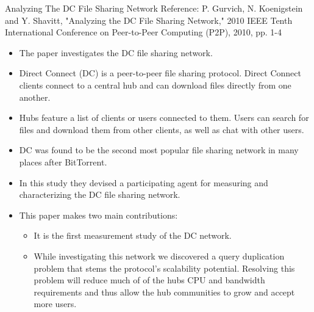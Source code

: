 \documentclass[9pt]{beamer}
\begin{document}
\begin{frame}{Analyzing The DC File Sharing Network}
    \small Reference: P. Gurvich, N. Koenigstein and Y. Shavitt, "Analyzing the DC File Sharing Network," 2010 IEEE Tenth International Conference on Peer-to-Peer Computing (P2P), 2010, pp. 1-4
    \break
    \begin{itemize}
        \item The paper investigates the DC file sharing network.
        \item Direct Connect (DC) is a peer-to-peer file sharing protocol. Direct Connect clients connect to a central hub and can download files directly from one another.
        \item Hubs feature a list of clients or users connected to them. Users can search for files and download them from other clients, as well as chat with other users.
        \item DC was found to be the second most popular file sharing network in many places after BitTorrent.
        \item In this study they devised a participating agent for measuring and characterizing the DC file sharing network.
        \item This paper makes two main contributions:
             \begin{itemize}
                 \item It is the first measurement study of the DC network. 
                 \item While investigating this network we discovered a query duplication problem that stems the protocol’s scalability potential. Resolving this problem will reduce much of of the hubs CPU and bandwidth requirements and thus allow the hub communities to grow and accept more users.
             \end{itemize}
    \end{itemize}
\end{frame}
\end{document}
